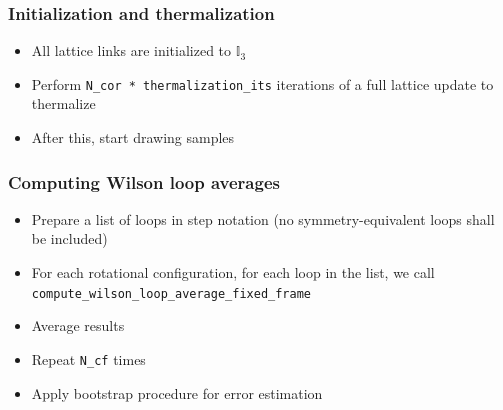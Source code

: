 \documentclass{beamer}
\begin{document}
\begin{frame}
    \frametitle{Initialization and thermalization}
    \begin{itemize}
        \item All lattice links are initialized to $\mathbb{I}_3$
        \item Perform \texttt{N\_cor * thermalization\_its} iterations of a full lattice update to thermalize
        \item After this, start drawing samples
    \end{itemize}
\end{frame}

\begin{frame}
    \frametitle{Computing Wilson loop averages}
    \begin{itemize}
        \item Prepare a list of loops in step notation (no symmetry-equivalent loops shall be included)
        \item For each rotational configuration, for each loop in the list, we call \texttt{compute\_wilson\_loop\_average\_fixed\_frame}
        \item Average results
        \item Repeat \texttt{N\_cf} times
        \item Apply bootstrap procedure for error estimation
    \end{itemize}
\end{frame}
\end{document}
